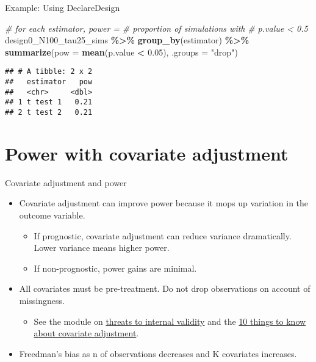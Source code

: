 \documentclass[
  ignorenonframetext,
]{beamer}
\newenvironment{Shaded}{\begin{snugshade}}{\end{snugshade}}
\newcommand{\CommentTok}[1]{\textcolor[rgb]{0.56,0.35,0.01}{\textit{#1}}}
\newcommand{\DataTypeTok}[1]{\textcolor[rgb]{0.13,0.29,0.53}{#1}}
\newcommand{\FloatTok}[1]{\textcolor[rgb]{0.00,0.00,0.81}{#1}}
\newcommand{\KeywordTok}[1]{\textcolor[rgb]{0.13,0.29,0.53}{\textbf{#1}}}
\newcommand{\NormalTok}[1]{#1}
\newcommand{\OperatorTok}[1]{\textcolor[rgb]{0.81,0.36,0.00}{\textbf{#1}}}
\newcommand{\StringTok}[1]{\textcolor[rgb]{0.31,0.60,0.02}{#1}}
\providecommand{\tightlist}{%
  \setlength{\itemsep}{0pt}\setlength{\parskip}{0pt}}
\begin{document}
\begin{frame}[fragile]{Example: Using DeclareDesign}
\begin{Shaded}
\begin{Highlighting}[]
\CommentTok{\# for each estimator, power =}
\CommentTok{\# proportion of simulations with}
\CommentTok{\# p.value \textless{} 0.5}
\NormalTok{design0\_N100\_tau25\_sims }\OperatorTok{\%\textgreater{}\%}
\StringTok{    }\KeywordTok{group\_by}\NormalTok{(estimator) }\OperatorTok{\%\textgreater{}\%}
\StringTok{    }\KeywordTok{summarize}\NormalTok{(}\DataTypeTok{pow =} \KeywordTok{mean}\NormalTok{(p.value }\OperatorTok{\textless{}}\StringTok{ }\FloatTok{0.05}\NormalTok{),}
        \DataTypeTok{.groups =} \StringTok{"drop"}\NormalTok{)}
\end{Highlighting}
\end{Shaded}

\begin{verbatim}
## # A tibble: 2 x 2
##   estimator   pow
##   <chr>     <dbl>
## 1 t test 1   0.21
## 2 t test 2   0.21
\end{verbatim}
\end{frame}

\hypertarget{power-with-covariate-adjustment}{%
\section{Power with covariate
adjustment}\label{power-with-covariate-adjustment}}

\begin{frame}{Covariate adjustment and power}
\protect\hypertarget{covariate-adjustment-and-power}{}
\begin{itemize}
\item
  Covariate adjustment can improve power because it mops up variation in
  the outcome variable.

  \begin{itemize}
  \item
    If prognostic, covariate adjustment can reduce variance
    dramatically. Lower variance means higher power.
  \item
    If non-prognostic, power gains are minimal.
  \end{itemize}
\item
  All covariates must be pre-treatment. Do not drop observations on
  account of missingness.

  \begin{itemize}
  \tightlist
  \item
    See the module on
    \href{threats-to-internal-validity-of-randomized-experiments.html}{threats
    to internal validity} and the
    \href{https://egap.org/resource/10-things-to-know-about-covariate-adjustment/}{10
    things to know about covariate adjustment}.
  \end{itemize}
\item
  Freedman's bias as n of observations decreases and K covariates
  increases.
\end{itemize}
\end{frame}
\end{document}
